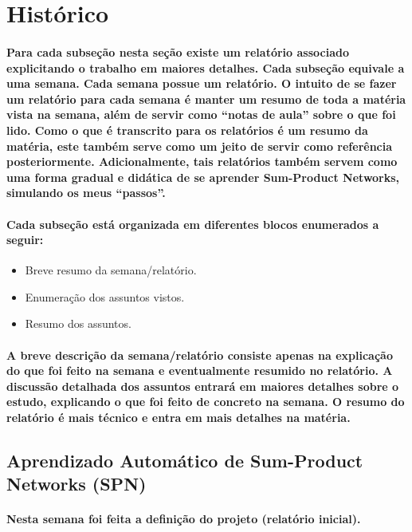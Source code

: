 \documentclass[a4paper,10pt]{article}
\theoremstyle{plain}
\begin{document}
\section{Histórico}

\paragraph{
  Para cada subseção nesta seção existe um relatório associado explicitando o trabalho em maiores
  detalhes. Cada subseção equivale a uma semana. Cada semana possue um relatório. O intuito de se
  fazer um relatório para cada semana é manter um resumo de toda a matéria vista na semana, além
  de servir como ``notas de aula'' sobre o que foi lido. Como o que é transcrito para os relatórios
  é um resumo da matéria, este também serve como um jeito de servir como referência posteriormente.
  Adicionalmente, tais relatórios também servem como uma forma gradual e didática de se aprender
  Sum-Product Networks, simulando os meus ``passos''.
}

\paragraph{
  Cada subseção está organizada em diferentes blocos enumerados a seguir:
}

\begin{itemize}
  \item Breve resumo da semana/relatório.
  \item Enumeração dos assuntos vistos.
  \item Resumo dos assuntos.
\end{itemize}

\paragraph{
  A breve descrição da semana/relatório consiste apenas na explicação do que foi feito na semana e
  eventualmente resumido no relatório. A discussão detalhada dos assuntos entrará em maiores
  detalhes sobre o estudo, explicando o que foi feito de concreto na semana. O resumo do relatório
  é mais técnico e entra em mais detalhes na matéria.
}

\subsection{Aprendizado Automático de Sum-Product Networks (SPN)}

\paragraph{
  Nesta semana foi feita a definição do projeto (relatório inicial).\cite{project-def}
}
\end{document}

